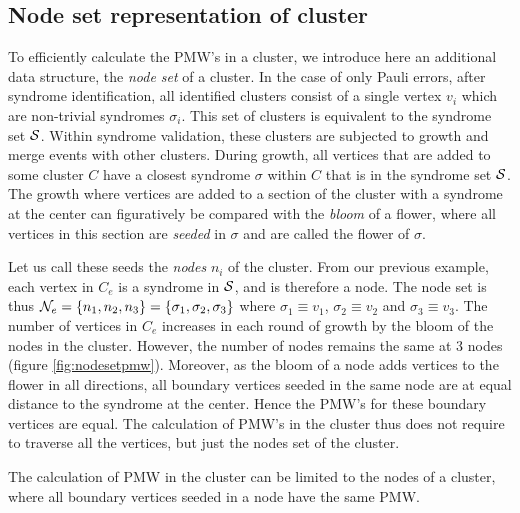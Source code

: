 \subsection{Node set representation of cluster}\label{sec:nodeset}

To efficiently calculate the PMW's in a cluster, we introduce here an additional data structure, the \emph{node set} of a cluster. In the case of only Pauli errors, after syndrome identification, all identified clusters consist of a single vertex $v_i$ which are non-trivial syndromes $\sigma_i$. This set of clusters is equivalent to the syndrome set $\mathcal{S}$. Within syndrome validation, these clusters are subjected to growth and merge events with other clusters. During growth, all vertices that are added to some cluster $C$ have a closest syndrome $\sigma$ within $C$ that is in the syndrome set $\mathcal{S}$. The growth where vertices are added to a section of the cluster with a syndrome at the center can figuratively be compared with the \emph{bloom} of a flower, where all vertices in this section are \emph{seeded} in $\sigma$ and are called the flower of $\sigma$. 

Let us call these seeds the \emph{nodes} $n_i$ of the cluster. From our previous example, each vertex in $C_e$ is a syndrome in $\mathcal{S}$, and is therefore a node. The node set is thus $\mathcal{N}_e = \{n_1, n_2, n_3\} = \{\sigma_1, \sigma_2, \sigma_3\}$ where $\sigma_1 \equiv v_1$, $\sigma_2 \equiv v_2$ and $\sigma_3 \equiv v_3$. The number of vertices in $C_e$ increases in each round of growth by the bloom of the nodes in the cluster. However, the number of nodes remains the same at 3 nodes (figure \ref{fig:nodesetpmw}). Moreover, as the bloom of a node adds vertices to the flower in all directions, all boundary vertices seeded in the same node are at equal distance to the syndrome at the center. Hence the PMW's for these boundary vertices are equal. The calculation of PMW's in the cluster thus does not require to traverse all the vertices, but just the nodes set of the cluster.

\begin{lemma}
  The calculation of PMW in the cluster can be limited to the nodes of a cluster, where all boundary vertices seeded in a node have the same PMW.
\end{lemma}

